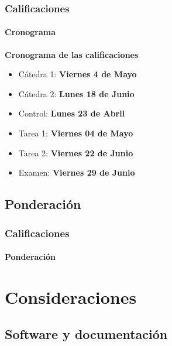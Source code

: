\documentclass{beamer}
\begin{document}
        \begin{frame}
            \frametitle{Calificaciones}
            \framesubtitle{Cronograma}

            \textbf{Cronograma de las calificaciones}

            \begin{itemize}
                \item C\'atedra 1: \textbf{Viernes 4 de Mayo}
                \item C\'atedra 2: \textbf{Lunes 18 de Junio}
                \item Control: \textbf{Lunes 23 de Abril}
                \item Tarea 1: \textbf{Viernes 04 de Mayo}
                \item Tarea 2: \textbf{Viernes 22 de Junio}
                \item Examen: \textbf{Viernes 29 de Junio}
            \end{itemize}
        \end{frame}

        \subsection{Ponderaci\'on}

        \begin{frame}
            \frametitle{Calificaciones}
            \framesubtitle{Ponderaci\'on}

            \begin{center}
                
            \end{center}    
        \end{frame}

    \section{Consideraciones}

        \subsection{Software y documentaci\'on}
\end{document}
